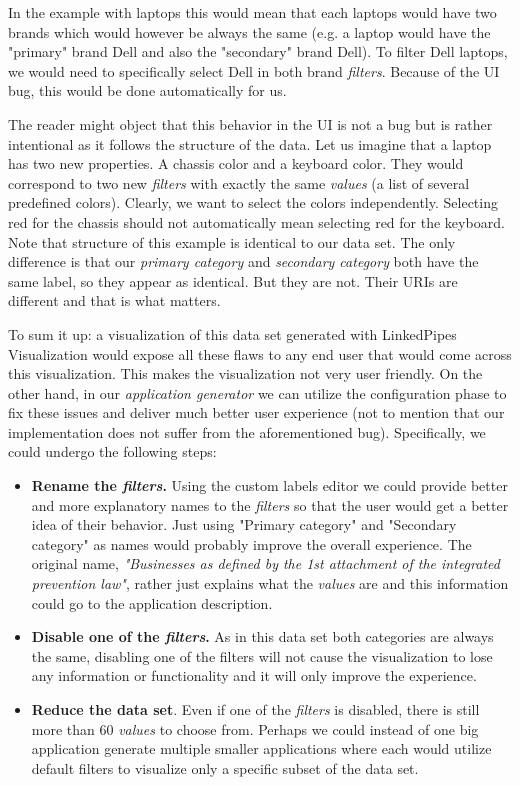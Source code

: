 In the example with laptops this would mean that each laptops would have two brands which would however be always the same (e.g. a laptop would have the "primary" brand Dell and also the "secondary" brand Dell). To filter Dell laptops, we would need to specifically select Dell in both brand \emph{filters}. Because of the UI bug, this would be done automatically for us.

The reader might object that this behavior in the UI is not a bug but is rather intentional as it follows the structure of the data. Let us imagine that a laptop has two new properties. A chassis color and a keyboard color. They would correspond to two new \emph{filters} with exactly the same \emph{values} (a list of several predefined colors). Clearly, we want to select the colors independently. Selecting red for the chassis should not automatically mean selecting red for the keyboard. Note that structure of this example is identical to our data set. The only difference is that our \emph{primary category} and \emph{secondary category} both have the same label, so they appear as identical. But they are not. Their URIs are different and that is what matters.

To sum it up: a visualization of this data set generated with LinkedPipes Visualization would expose all these flaws to any end user that would come across this visualization. This makes the visualization not very user friendly. On the other hand, in our \emph{application generator} we can utilize the configuration phase to fix these issues and deliver much better user experience (not to mention that our implementation does not suffer from the aforementioned bug). Specifically, we could undergo the following steps:

\begin{itemize}
\item \textbf{Rename the \emph{filters}.} Using the custom labels editor we could provide better and more explanatory names to the \emph{filters} so that the user would get a better idea of their behavior. Just using "Primary category" and "Secondary category" as names would probably improve the overall experience. The original name, \textit{"Businesses as defined by the 1st attachment of the integrated prevention law"}, rather just explains what the \emph{values} are and this information could go to the application description.
\item \textbf{Disable one of the \emph{filters}.} As in this data set both categories are always the same, disabling one of the filters will not cause the visualization to lose any information or functionality and it will only improve the experience.
\item \textbf{Reduce the data set}. Even if one of the \emph{filters} is disabled, there is still more than 60 \emph{values} to choose from. Perhaps we could instead of one big application generate multiple smaller applications where each would utilize default filters to visualize only a specific subset of the data set.
\end{itemize}

